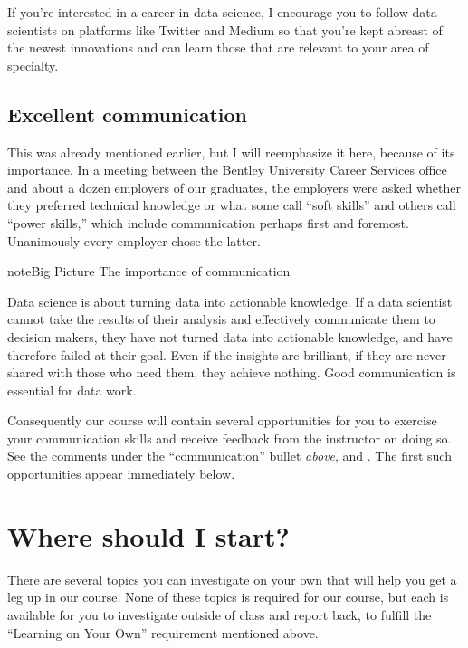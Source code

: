 \documentclass[letterpaper,10pt,english]{jupyterBook}
\begin{document}
\sphinxAtStartPar
If you’re interested in a career in data science, I encourage you to follow data scientists on platforms like Twitter and Medium so that you’re kept abreast of the newest innovations and can learn those that are relevant to your area of specialty.


\subsection{Excellent communication}
\label{\detokenize{chapter-1-intro-to-data-science:excellent-communication}}
\sphinxAtStartPar
This was already mentioned earlier, but I will re\sphinxhyphen{}emphasize it here, because of its importance.  In a meeting between the Bentley University Career Services office and about a dozen employers of our graduates, the employers were asked whether they preferred technical knowledge or what some call “soft skills” and others call “power skills,” which include communication perhaps first and foremost.  Unanimously every employer chose the latter.

\begin{sphinxadmonition}{note}{Big Picture \sphinxhyphen{} The importance of communication}

\sphinxAtStartPar
Data science is about turning data into actionable knowledge.  If a data scientist cannot take the results of their analysis and effectively communicate them to decision makers, they have not turned data into actionable knowledge, and have therefore failed at their goal.  Even if the insights are brilliant, if they are never shared with those who need them, they achieve nothing.  Good communication is essential for data work.
\end{sphinxadmonition}

\sphinxAtStartPar
Consequently our course will contain several opportunities for you to exercise your communication skills and receive feedback from the instructor on doing so.  See the comments under the “communication” bullet {\hyperref[\detokenize{chapter-1-intro-to-data-science:what-s-in-our-course}]{\emph{above}}}, and {\hyperref[\detokenize{course-schedule::doc}]{}}.  The first such opportunities appear immediately below.


\section{Where should I start?}
\label{\detokenize{chapter-1-intro-to-data-science:where-should-i-start}}
\sphinxAtStartPar
There are several topics you can investigate on your own that will help you get a leg up in our course.  None of these topics is required for our course, but each is available for you to investigate outside of class and report back, to fulfill the “Learning on Your Own” requirement mentioned above.
\end{document}

